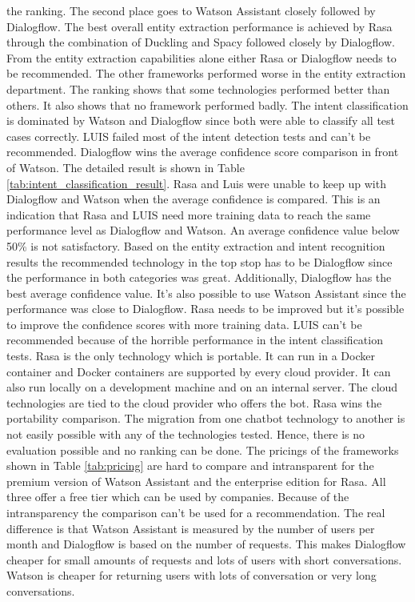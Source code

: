the ranking.
The second place goes to Watson Assistant closely followed by Dialogflow.
The best overall entity extraction performance is achieved by Rasa through 
the combination of Duckling and Spacy followed closely by Dialogflow.
From the entity extraction capabilities alone either Rasa or 
Dialogflow needs to be recommended.
The other frameworks performed worse in the entity extraction 
department.
The ranking shows that some technologies performed better than others.
It also shows that no framework performed badly.
The intent classification is dominated by Watson and Dialogflow since 
both were able to classify all test cases correctly.
LUIS failed most of the intent detection tests and can't be recommended.
Dialogflow wins the average confidence score comparison in front of Watson.
The detailed result is shown in Table \ref{tab:intent_classification_result}.
Rasa and Luis were unable to keep up with Dialogflow and Watson when the 
average confidence is compared.
This is an indication that Rasa and LUIS need more training data to 
reach the same performance level as Dialogflow and Watson.
An average confidence value below 50\% is not satisfactory.
Based on the entity extraction and intent recognition results
the recommended technology in the top stop has to be Dialogflow
since the performance in both categories was great.
Additionally, Dialogflow has the best average confidence value.
It's also possible to use Watson Assistant since the performance was close to Dialogflow.
Rasa needs to be improved but it's possible to improve the confidence scores with more training data.
LUIS can't be recommended because of the horrible performance in the intent classification tests.
Rasa is the only technology which is portable.
It can run in a Docker container and Docker containers are supported by every 
cloud provider.
It can also run locally on a development machine and on an internal server.
The cloud technologies are tied to the cloud provider who offers the bot.
Rasa wins the portability comparison.
The migration from one chatbot technology to another is not easily possible with 
any of the technologies tested. 
Hence, there is no evaluation possible and no ranking can be done.
The pricings of the frameworks shown in Table \ref{tab:pricing} are hard to compare and 
intransparent for the premium version of Watson Assistant and the enterprise edition for Rasa.
All three offer a free tier which can be used by companies.
Because of the intransparency the comparison can't be used for a recommendation.
The real difference is that Watson Assistant is measured by the number of users per month and 
Dialogflow is based on the number of requests.
This makes Dialogflow cheaper for small amounts of requests and lots of users with short conversations.
Watson is cheaper for returning users with lots of conversation or very long conversations.

